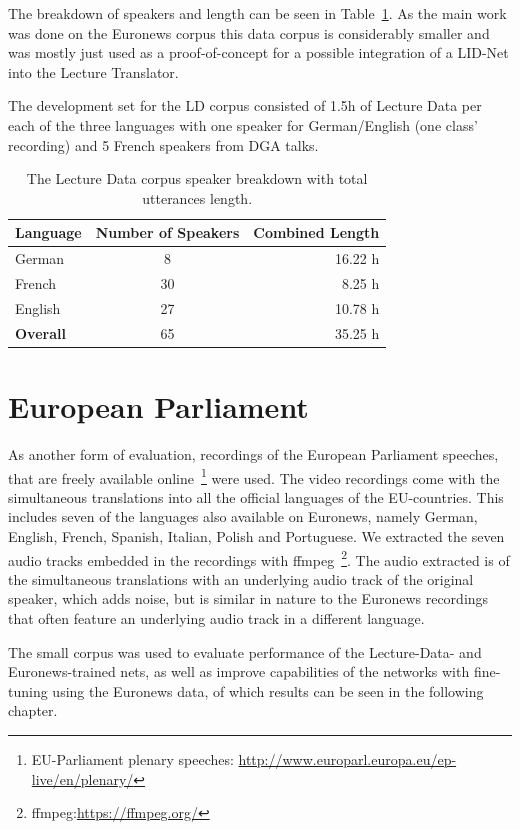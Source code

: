 The breakdown of speakers and length can be seen in Table~\ref{tab:spkDataLD}. As the main work was done on the Euronews corpus this data corpus is considerably smaller and was mostly just used as a proof-of-concept for a possible integration of a LID-Net into the Lecture Translator. 

The development set for the LD corpus consisted of 1.5h of Lecture Data per each of the three languages with one speaker for German/English (one class' recording) and 5 French speakers from DGA talks.
\begin{table}[h!]
\caption{The Lecture Data corpus speaker breakdown with total utterances length.}
\label{tab:spkDataLD}
\centering
\begin{tabular}{| l | c | r | }
	\hline
	\textbf{Language} & \textbf{Number of Speakers} & \textbf{Combined Length} \\
	\hline
	German & 8 &  16.22 h \\
	French & 30 & 8.25 h \\  
	English & 27 & 10.78 h \\ 
	\hline
	\textbf{Overall} & 65 & 35.25 h\\
	\hline	
\end{tabular}
\end{table}

\section{European Parliament}
\label{sec:LITasks:EU}

As another form of evaluation, recordings of the European Parliament speeches, that are freely available online~\footnote{EU-Parliament plenary speeches: \url{http://www.europarl.europa.eu/ep-live/en/plenary/}} were used. The video recordings come with the simultaneous translations into all the official languages of the EU-countries.  This includes seven of the languages also available on Euronews, namely German, English, French, Spanish, Italian, Polish and Portuguese. We extracted the seven audio tracks embedded in the recordings with ffmpeg~\footnote{ffmpeg:\url{https://ffmpeg.org/}}. The audio extracted is of the simultaneous translations with an underlying audio track of the original speaker, which adds noise, but is similar in nature to the Euronews recordings that often feature an underlying audio track in a different language.

The small corpus was used to evaluate performance of the Lecture-Data- and Euronews-trained nets, as well as improve capabilities of the networks with fine-tuning using the Euronews data, of which results can be seen in the following chapter.

